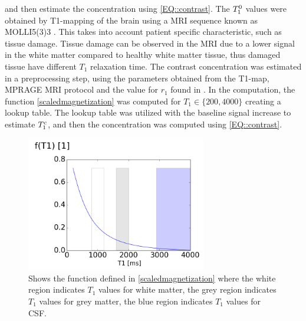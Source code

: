 \documentclass[12pt,a4paper]{article}
\begin{document}
and then estimate the concentration using \eqref{EQ::contrast}. The $T_{1}\sp{0}$ values were obtained by T1-mapping of the brain using a MRI sequence known as MOLLI5(3)3 \cite{TAYLOR201667}. This takes into account patient specific characteristic, such as tissue damage. Tissue damage can be observed in the MRI due to a lower signal in the white matter compared to healthy white matter tissue, thus damaged tissue have different $T_1$ relaxation time. 
The contrast concentration was estimated in a preprocessing step, using the parameters obtained from the T1-map, MPRAGE MRI protocol \cite{ringstad2018brain} and the value for $r_1$ found in \cite{pmid16230904}. In the computation, the function \eqref{scaledmagnetization} was computed for $ T_1\in \lbrace 200, 4000 \rbrace$ creating a lookup table. The lookup table was utilized with the baseline signal increase to estimate $T_1\sp{c}$, and then the concentration was computed using \eqref{EQ::contrast}.  

\begin{figure}
\centering
\includegraphics[width=0.70\textwidth]{T1function.png} 
\caption{Shows the  function defined in \eqref{scaledmagnetization} where the white region indicates $T_1$ values for white matter, the grey region indicates $T_1$ values for grey matter, the blue region indicates $T_1$ values for CSF.  }
\label{figureF} 
\end{figure}
\end{document}
